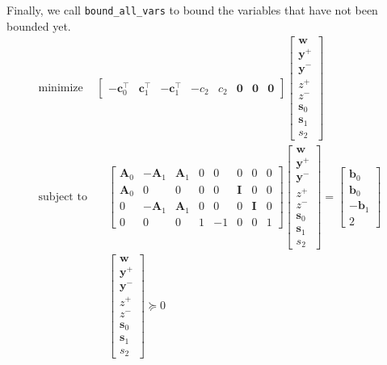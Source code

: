 \documentclass[11pt]{article}
\begin{document}
Finally, we call \texttt{bound\_all\_vars} to bound the variables that have not been bounded yet.
\begin{align}
    \text{minimize} & 
    \begin{bmatrix}
        -\textbf{c}_0^\top & \textbf{c}_1^\top & -\textbf{c}_1^\top & -c_2 & c_2 & \textbf{0} & \textbf{0} & \textbf{0}
    \end{bmatrix}
    \begin{bmatrix}
        \textbf{w} \\ \textbf{y}^+ \\ \textbf{y}^- \\ z^+ \\ z^- \\ \textbf{s}_0 \\ \textbf{s}_1 \\ s_2
    \end{bmatrix}
     \\
    \text{subject to} & \quad 
    \begin{bmatrix}
        \textbf{A}_0 & -\textbf{A}_1 & \textbf{A}_1 & 0 &  0 & 0 & 0 & 0 \\
        \textbf{A}_0 & 0 & 0 & 0& 0 & \textbf{I} & 0 & 0 \\
        0 & -\textbf{A}_1 & \textbf{A}_1 & 0 & 0 & 0 & \textbf{I} & 0 \\
        0 & 0 & 0 & 1 & -1 & 0 & 0 & 1
    \end{bmatrix}
    \begin{bmatrix}
        \textbf{w} \\ \textbf{y}^+ \\ \textbf{y}^- \\ z^+ \\ z^- \\ \textbf{s}_0 \\ \textbf{s}_1 \\ s_2
    \end{bmatrix}
    =
    \begin{bmatrix}
        \textbf{b}_0 \\ \textbf{b}_0 \\ -\textbf{b}_1 \\ 2
    \end{bmatrix}
    \\
    & \quad 
    \begin{bmatrix}
        \textbf{w} \\ \textbf{y}^+ \\ \textbf{y}^- \\ z^+ \\ z^- \\ \textbf{s}_0 \\ \textbf{s}_1 \\ s_2
    \end{bmatrix}
    \succeq 0
\end{align}
\end{document}
